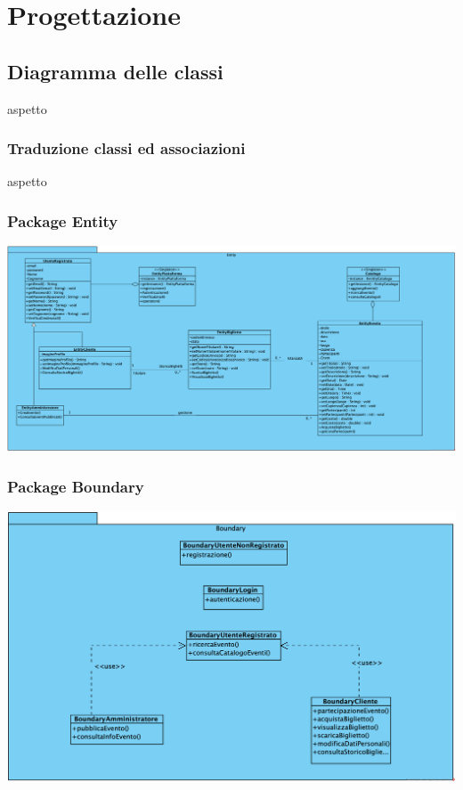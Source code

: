 \chapter{Progettazione}
\section{Diagramma delle classi }
aspetto
\subsection{Traduzione classi ed associazioni}
aspetto
\subsection{Package Entity}
\begin{center}	
	\vspace{1ex}
	\includegraphics[height=0.38\linewidth]{assets/package/entity.png}
	\vspace{1ex}
\end{center}
\subsection{Package Boundary}
\begin{center}	
	\vspace{1ex}
	\includegraphics[height=0.38\linewidth]{assets/package/Boundary.png}
	\vspace{1ex}
\end{center}
